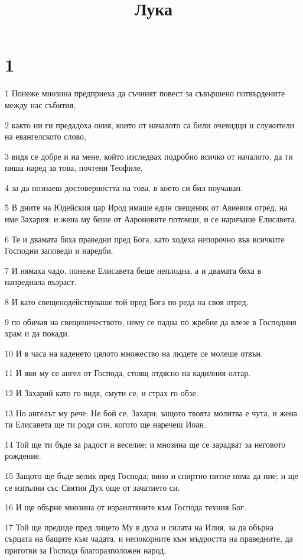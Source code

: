 

\title{Лука}


\chapter{1}

\par 1 Понеже мнозина предприеха да съчинят повест за съвършено потвърдените между нас събития,
\par 2 както ни ги предадоха ония, които от началото са били очевидци и служители на евангелското слово,
\par 3 видя се добре и на мене, който изследвах подробно всичко от началото, да ти пиша наред за това, почтени Теофиле,
\par 4 за да познаеш достоверността на това, в което си бил поучаван.
\par 5 В дните на Юдейския цар Ирод имаше един свещеник от Авиевия отред, на име Захария; и жена му беше от Аароновите потомци, и се наричаше Елисавета.
\par 6 Те и двамата бяха праведни пред Бога, като ходеха непорочно във всичките Господни заповеди и наредби.
\par 7 И нямаха чадо, понеже Елисавета беше неплодна, а и двамата бяха в напреднала възраст.
\par 8 И като свещенодействуваше той пред Бога по реда на своя отред,
\par 9 по обичая на свещеничеството, нему се падна по жребие да влезе в Господния храм и да покади.
\par 10 И в часа на каденето цялото множество на людете се молеше отвън.
\par 11 И яви му се ангел от Господа, стоящ отдясно на кадилния олтар.
\par 12 И Захарий като го видя, смути се, и страх го обзе.
\par 13 Но ангелът му рече: Не бой се, Захари; защото твоята молитва е чута, и жена ти Елисавета ще ти роди син, когото ще наречеш Иоан.
\par 14 Той ще ти бъде за радост и веселие; и мнозина ще се зарадват за неговото рождение.
\par 15 Защото ще бъде велик пред Господа; вино и спиртно питие няма да пие; и ще се изпълни със Святия Дух още от зачатието си.
\par 16 И ще обърне мнозина от израилтяните към Господа техния Бог.
\par 17 Той ще предиде пред лицето Му в духа и силата на Илия, за да обърна сърцата на бащите към чадата, и непокорните към мъдростта на праведните, да приготви за Господа благоразположен народ.
